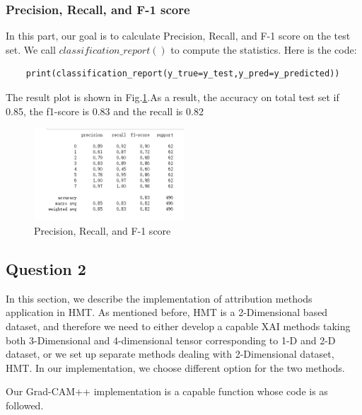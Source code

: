 \documentclass[conference]{IEEEtran}
\begin{document}
\subsubsection{Precision, Recall, and F-1 score}
In this part, our goal is to calculate Precision, Recall, and F-1 score on the test set. We call
$classification\_report()$ to compute the statistics. Here is the code:
\begin{lstlisting}
    print(classification_report(y_true=y_test,y_pred=y_predicted))
\end{lstlisting}
The result plot is shown in Fig.\ref{Fig.t3q1d}.As a result, the accuracy on total test set if 0.85, the f1-score is 0.83 and the recall is 0.82
\begin{figure}[h] 
    \centering
    \includegraphics[width=0.5\textwidth]{T3Q1d.png}
    \caption{Precision, Recall, and F-1 score} 
    \label{Fig.t3q1d} 
\end{figure}

\subsection{Question 2}

In this section, we describe the implementation of attribution methods application in HMT. As mentioned before, HMT is a 2-Dimensional based dataset, and therefore we need to either develop a capable XAI methods taking both 3-Dimensional and 4-dimensional tensor corresponding to 1-D and 2-D dataset, or we set up separate methods dealing with 2-Dimensional dataset, HMT. In our implementation, we choose different option for the two methods.\par

Our Grad-CAM++ implementation is a capable function whose code is as followed.
\end{document}
